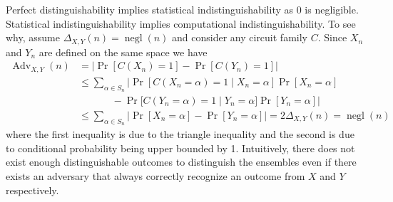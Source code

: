 Perfect distinguishability implies statistical indistinguishability as 0 is negligible. Statistical indistinguishability implies computational indistinguishability. To see why, assume $\Delta_{X,Y}(n) = \operatorname{negl}(n)$ and consider any circuit family $C$. Since $X_n$ and $Y_n$ are defined on the same space we have
\begin{equation*}
\begin{aligned}
    \operatorname{Adv}_{X,Y}(n) &= |\operatorname{Pr}[C(X_n) = 1] - \operatorname{Pr}[C(Y_n) = 1]|\\
        &\leq \sum_{\alpha \in S_n} | \operatorname{Pr}[C(X_n = \alpha) = 1 \; | \; X_n = \alpha]\operatorname{Pr}[X_n = \alpha] \\
        &\phantom{=} \qquad - \operatorname{Pr}[C(Y_n = \alpha) = 1 \; | \; Y_n = \alpha]\operatorname{Pr}[Y_n = \alpha] | \\
        &\leq \sum_{\alpha \in S_n} | \operatorname{Pr}[X_n = \alpha] - \operatorname{Pr}[Y_n = \alpha]| = 2\Delta_{X,Y}(n) = \operatorname{negl}(n)
\end{aligned}
\end{equation*}
where the first inequality is due to the triangle inequality and the second is due to conditional probability being upper bounded by 1. Intuitively, there does not exist enough distinguishable outcomes to distinguish the ensembles even if there exists an adversary that always correctly recognize an outcome from $X$ and $Y$ respectively.
